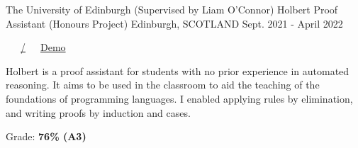 \begin{cventries}
  \cventry
    {The University of Edinburgh (Supervised by Liam O'Connor)} %
    {Holbert Proof Assistant (Honours Project)} %
    {Edinburgh, SCOTLAND} %
    {Sept. 2021 - April 2022} %
    {
      \color{awesome}  \color{graytext}\ \ \ \href{https://github.com/chrisjpm/holbert}{\faGithub\acvHeaderIconSep\@chrisjpm/\@holbert}\ \ \ \href{http://liamoc.net/holbert}{\faGlobe\acvHeaderIconSep\@Holbert Demo}\ \ \ \href{https://github.com/chrisjpm/holbert/blob/master/report.pdf}{\faFile*[regular]\acvHeaderIconSep\@Thesis}
      \vspace{1.6em}
      \begin{cvitems} %
        \item Holbert is a proof assistant for students with no prior experience in automated reasoning. It aims to be used in the classroom to aid the teaching of the foundations of programming languages. I enabled applying rules by elimination, and writing proofs by induction and cases.
        \item Grade: \textbf{76\% (A3)}
      \end{cvitems}
    }
    


\end{cventries}
